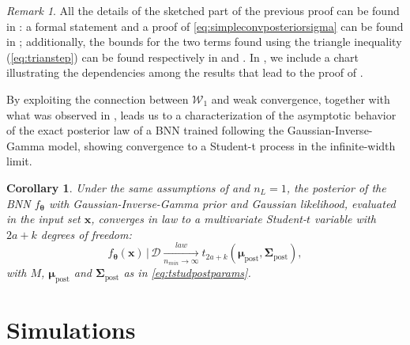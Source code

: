\documentclass[a4paper, 11pt, reqno]{amsart}
\theoremstyle{plain}
\newtheorem{corollary}[theorem]{Corollary}
\theoremstyle{remark}
\newtheorem{remark}[theorem]{Remark}
\theoremstyle{definition}
\newcommand{\given}{\, | \,}
\newcommand{\tstud}[3]{t_{#1}\left(#2, #3\right)}
\newcommand{\train}{\mathcal{D}}
\begin{document}

\begin{remark}
    All the details of the sketched part of the previous proof can be found in : a formal statement and a proof of \cref{eq:simpleconvposteriorsigma} can be found in ; additionally, the bounds for the two terms found using the triangle inequality (\cref{eq:trianstep}) can be found respectively in  and . 
    In , we include a chart illustrating the dependencies among the results that lead to the proof of .
\end{remark}

\begin{figure}[omitted: a diagram of this paper's results, not reproduced here]\label{fig:chartmain}\end{figure}

By exploiting the connection between $\mathcal{W}_1$ and weak convergence, together with what was observed in ,  leads us to a characterization of the asymptotic behavior of the exact posterior law of a BNN trained following the Gaussian-Inverse-Gamma model, showing convergence to a Student-t process in the infinite-width limit.

\begin{corollary} \label{cor:studposterior}
    Under the same assumptions of  and $n_L = 1$, the posterior of the BNN $f_{\bm{\theta}}$ with Gaussian-Inverse-Gamma prior and Gaussian likelihood, evaluated in the input set $\bm{x}$, converges in law to a multivariate Student-$t$ variable with $2a+k$ degrees of freedom:
    \begin{equation*}
        f_{\bm{\theta}}(\bm{x}) \given \train \xrightarrow[n_{min} \to \infty]{law} \tstud{2a + k}{\bm{\mu}_{\mathrm{post}}}{\bm{\Sigma}_{\mathrm{post}}},
    \end{equation*}
    with $M$, $\bm{\mu}_{\mathrm{post}}$ and $\bm{\Sigma}_{\mathrm{post}}$ as in \cref{eq:tstudpostparams}.
\end{corollary}

\section{Simulations} \label{sec:simulations}
\end{document}
